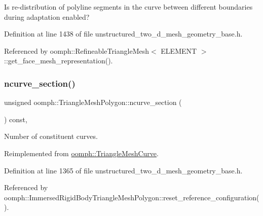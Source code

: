 Is re-\/distribution of polyline segments in the curve between different boundaries during adaptation enabled? 



Definition at line 1438 of file unstructured\+\_\+two\+\_\+d\+\_\+mesh\+\_\+geometry\+\_\+base.\+h.



Referenced by oomph\+::\+Refineable\+Triangle\+Mesh$<$ E\+L\+E\+M\+E\+N\+T $>$\+::get\+\_\+face\+\_\+mesh\+\_\+representation().

\mbox{\label{classoomph_1_1TriangleMeshPolygon_a6ef43be1b982a8dcc2f10545ab251bdb}} 
\subsubsection{\texorpdfstring{ncurve\+\_\+section()}{ncurve\_section()}}
{\footnotesize\ttfamily unsigned oomph\+::\+Triangle\+Mesh\+Polygon\+::ncurve\+\_\+section (\begin{DoxyParamCaption}{ }\end{DoxyParamCaption}) const\hspace{0.3cm}{\ttfamily [inline]}, {\ttfamily [virtual]}}



Number of constituent curves. 



Reimplemented from \hyperlink{classoomph_1_1TriangleMeshCurve_af0b316414dd4a848b8bdfe314e5200ea}{oomph\+::\+Triangle\+Mesh\+Curve}.



Definition at line 1365 of file unstructured\+\_\+two\+\_\+d\+\_\+mesh\+\_\+geometry\+\_\+base.\+h.



Referenced by oomph\+::\+Immersed\+Rigid\+Body\+Triangle\+Mesh\+Polygon\+::reset\+\_\+reference\+\_\+configuration().

\mbox{\label{classoomph_1_1TriangleMeshPolygon_a050f497ebc58dd0baf036852f764dfd0}} 

